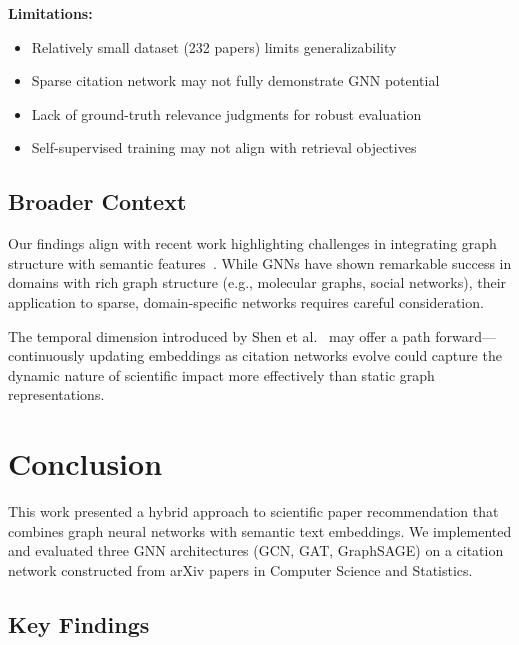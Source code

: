 \documentclass[pdflatex,sn-mathphys-num]{sn-jnl}
\theoremstyle{thmstyleone}%
\theoremstyle{thmstyletwo}%
\theoremstyle{thmstylethree}%
\begin{document}
\textbf{Limitations:}

\begin{itemize}
    \item Relatively small dataset (232 papers) limits generalizability
    \item Sparse citation network may not fully demonstrate GNN potential
    \item Lack of ground-truth relevance judgments for robust evaluation
    \item Self-supervised training may not align with retrieval objectives
\end{itemize}

\subsection{Broader Context}

Our findings align with recent work highlighting challenges in integrating graph structure with semantic features~\cite{gao2022graph}. While GNNs have shown remarkable success in domains with rich graph structure (e.g., molecular graphs, social networks), their application to sparse, domain-specific networks requires careful consideration.

The temporal dimension introduced by Shen et al.~\cite{shen2024temporal} may offer a path forward—continuously updating embeddings as citation networks evolve could capture the dynamic nature of scientific impact more effectively than static graph representations.

\section{Conclusion}\label{sec:conclusion}

This work presented a hybrid approach to scientific paper recommendation that combines graph neural networks with semantic text embeddings. We implemented and evaluated three GNN architectures (GCN, GAT, GraphSAGE) on a citation network constructed from arXiv papers in Computer Science and Statistics.

\subsection{Key Findings}
\end{document}
